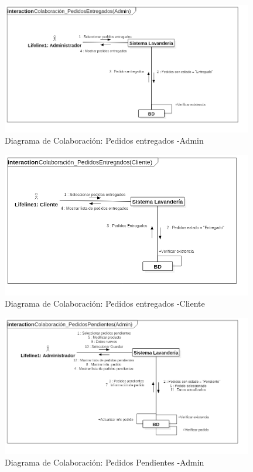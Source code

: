\begin{figure}[htb]
\begin{center}
\includegraphics[width=11cm]{./imagenes/diagramas/Colaboracion_PedidosEntregados(Admin).png}
\end{center}
\caption{Diagrama de Colaboración: Pedidos entregados -Admin}
\end{figure}


\begin{figure}[htb]
\begin{center}
\includegraphics[width=11cm]{./imagenes/diagramas/Colaboracion_PedidosEntregados(Cliente).png}
\end{center}
\caption{Diagrama de Colaboración: Pedidos entregados -Cliente}
\end{figure}


\begin{figure}[htb]
\begin{center}
\includegraphics[width=11cm]{./imagenes/diagramas/Colaboracion_PedidosPendientes(Admin).png}
\end{center}
\caption{Diagrama de Colaboración: Pedidos Pendientes -Admin }
\end{figure}


